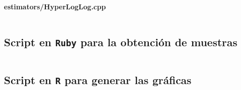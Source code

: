 \paragraph{estimators/HyperLogLog.cpp}
\inputminted{cpp}{../src/estimators/HyperLogLog.cpp}

\clearpage
\subsection{Script en \texttt{Ruby} para la obtención de muestras}
\label{codigo:ruby}
\inputminted{rb}{../test.rb}

\subsection{Script en \texttt{R} para generar las gráficas}
\label{codigo:graficas}
\inputminted{r}{../plots.r}